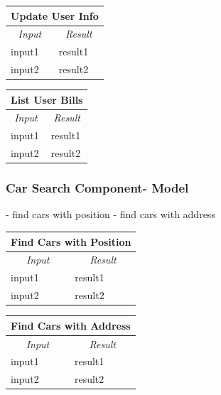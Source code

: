 \documentclass[english]{article}
\begin{document}
\begin{center}
	\begin{tabular}{ | m{6cm} | m{6cm} | }
		\hline
		\multicolumn{2}{|c|}{\textbf{Update User Info}} \\
		\hline
		\multicolumn{1}{|c|}{\textit{Input}} & \multicolumn{1}{c|}{\textit{Result}} \\
		\hline
		input1 & result1 \\
		\hline
		input2 & result2 \\
		\hline
	\end{tabular}
\end{center}

\begin{center}
	\begin{tabular}{ | m{6cm} | m{6cm} | }
		\hline
		\multicolumn{2}{|c|}{\textbf{List User Bills}} \\
		\hline
		\multicolumn{1}{|c|}{\textit{Input}} & \multicolumn{1}{c|}{\textit{Result}} \\
		\hline
		input1 & result1 \\
		\hline
		input2 & result2 \\
		\hline
	\end{tabular}
\end{center}

\subsubsection{Car Search Component- Model}
- find cars with position
- find cars with address

\begin{center}
	\begin{tabular}{ | m{6cm} | m{6cm} | }
		\hline
		\multicolumn{2}{|c|}{\textbf{Find Cars with Position}} \\
		\hline
		\multicolumn{1}{|c|}{\textit{Input}} & \multicolumn{1}{c|}{\textit{Result}} \\
		\hline
		input1 & result1 \\
		\hline
		input2 & result2 \\
		\hline
	\end{tabular}
\end{center}

\begin{center}
	\begin{tabular}{ | m{6cm} | m{6cm} | }
		\hline
		\multicolumn{2}{|c|}{\textbf{Find Cars with Address}} \\
		\hline
		\multicolumn{1}{|c|}{\textit{Input}} & \multicolumn{1}{c|}{\textit{Result}} \\
		\hline
		input1 & result1 \\
		\hline
		input2 & result2 \\
		\hline
	\end{tabular}
\end{center}
\end{document}
